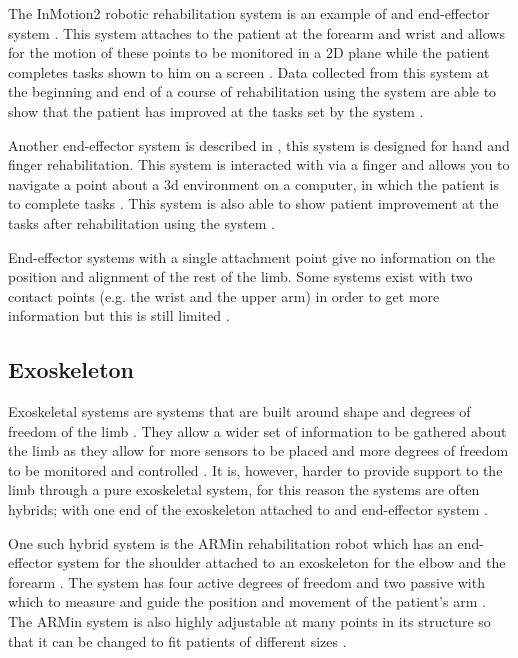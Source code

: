 \documentclass[journal]{IEEEtran}
\begin{document}
The InMotion2 robotic rehabilitation system is an example of and end-effector system \cite{QuantativeRobot}. 
This system attaches to the patient at the forearm and wrist and allows for the motion of these 
points to be monitored in a 2D plane while the patient completes tasks shown to him on 
a screen \cite{QuantativeRobot}. Data collected from this system at the beginning and end of a course of 
rehabilitation using the system are able to show that the patient has improved at the tasks 
set by the system \cite{QuantativeRobot}.

Another end-effector system is described in \cite{VRHandFinger}, this system is designed for 
hand and finger rehabilitation. This system is interacted with via a finger and allows you to navigate 
a point about a 3d environment on a computer, in which the patient is to complete tasks \cite{VRHandFinger}.
This system is also able to show patient improvement at the tasks after rehabilitation using the 
system \cite{VRHandFinger}.

End-effector systems with a single attachment point give no information on the position and 
alignment of the rest of the limb. Some systems exist with two contact points (e.g. the wrist 
and the upper arm) in order to get more information but this is still limited \cite{AdvancesPush}.

\subsection{Exoskeleton}
Exoskeletal systems are systems that are built around shape and degrees of freedom of the limb \cite{AdvancesPush}. 
They allow a wider set of information to be gathered about the limb as they allow for more sensors to be 
placed and more degrees of freedom to be monitored and controlled \cite{AdvancesPush}. It is, however, harder to 
provide support to the limb through a pure exoskeletal system, for this reason the systems are often 
hybrids; with one end of the exoskeleton attached to and end-effector system \cite{AdvancesPush}.

One such hybrid system is the ARMin rehabilitation robot which has an end-effector system for the 
shoulder attached to an exoskeleton for the elbow and the forearm \cite{ADLVE, ARMin}. The system has four active 
degrees of freedom and two passive with which to measure and guide the position and movement of 
the patient's arm \cite{ARMin}. The ARMin system is also highly adjustable at many points in its structure 
so that it can be changed to fit patients of different sizes \cite{ARMin}.
\end{document}
